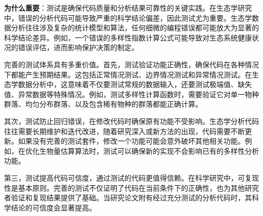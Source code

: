\documentclass[
]{book}
\newenvironment{Shaded}{\begin{snugshade}}{\end{snugshade}}
\newcommand{\AttributeTok}[1]{\textcolor[rgb]{0.13,0.29,0.53}{#1}}
\newcommand{\CommentTok}[1]{\textcolor[rgb]{0.56,0.35,0.01}{\textit{#1}}}
\newcommand{\ConstantTok}[1]{\textcolor[rgb]{0.56,0.35,0.01}{#1}}
\newcommand{\ControlFlowTok}[1]{\textcolor[rgb]{0.13,0.29,0.53}{\textbf{#1}}}
\newcommand{\DecValTok}[1]{\textcolor[rgb]{0.00,0.00,0.81}{#1}}
\newcommand{\FunctionTok}[1]{\textcolor[rgb]{0.13,0.29,0.53}{\textbf{#1}}}
\newcommand{\NormalTok}[1]{#1}
\newcommand{\OtherTok}[1]{\textcolor[rgb]{0.56,0.35,0.01}{#1}}
\newcommand{\SpecialCharTok}[1]{\textcolor[rgb]{0.81,0.36,0.00}{\textbf{#1}}}
\newcommand{\StringTok}[1]{\textcolor[rgb]{0.31,0.60,0.02}{#1}}
\begin{document}
\begin{Shaded}
\end{Shaded}

\textbf{为什么重要}：测试是确保代码质量和分析结果可靠性的关键实践。在生态学研究中，错误的分析代码可能导致严重的科学结论偏差，因此测试尤为重要。生态学数据分析往往涉及复杂的统计模型和算法，任何细微的编程错误都可能放大为显著的科学结论差异。例如，一个错误的多样性指数计算公式可能导致对生态系统健康状况的错误评估，进而影响保护决策的制定。

完善的测试体系具有多重价值。首先，测试验证功能正确性，确保代码在各种情况下都能产生预期结果。这包括正常情况测试、边界情况测试和异常情况测试。在生态学数据分析中，这意味着不仅要测试常规的数据输入，还要测试极端值、缺失值、异常数据等特殊情况。例如，测试多样性计算函数时，需要验证它对单一物种群落、均匀分布群落、以及包含稀有物种的群落都能正确计算。

其次，测试防止回归错误，在修改代码时确保原有功能不受影响。生态学分析代码往往需要长期维护和迭代改进，随着研究深入或新方法的出现，代码需要不断更新。如果没有完善的测试套件，修改一个功能可能会意外破坏其他相关功能。例如，在优化生物量估算算法时，测试可以确保新的实现不会影响已有的多样性分析功能。

第三，测试提高代码可信度，通过测试的代码更值得信赖。在科学研究中，可复现性是基本原则。完善的测试不仅证明了代码在当前条件下的正确性，也为其他研究者验证和复现结果提供了基础。当研究论文附有经过充分测试的分析代码时，其科学结论的可信度会显著提高。
\end{document}
